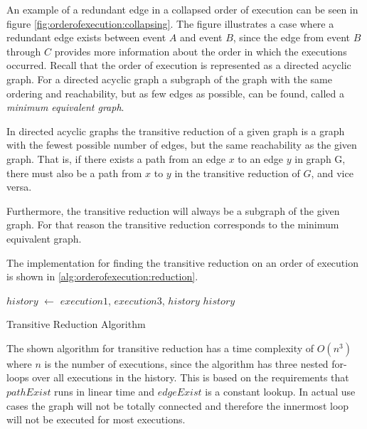 	\newpar An example of a redundant edge in a collapsed order of execution can be seen in figure \autoref{fig:orderofexecution:collapsing}. The figure illustrates a case where a redundant edge exists between event $A$ and event $B$, since the edge from event $B$ through $C$ provides more information about the order in which the executions occurred. 
	Recall that the order of execution is represented as a directed acyclic graph. For a directed acyclic graph a subgraph of the graph with the same ordering and reachability, but as few edges as possible, can be found, called a \textit{minimum equivalent graph}.
	
	\newpar In directed acyclic graphs the transitive reduction of a given graph is a graph with the fewest possible number of edges, but the same reachability as the given graph.	That is, if there exists a path from an edge $x$ to an edge $y$ in graph G, there must also be a path from $x$ to $y$ in the transitive reduction of $G$, and vice versa.
		
	Furthermore, the transitive reduction will always be a subgraph of the given graph. For that reason the transitive reduction corresponds to the minimum equivalent graph.
	
	The implementation for finding the transitive reduction on an order of execution is shown in \autoref{alg:orderofexecution:reduction}.
	
	\begin{algorithm}[H]
		\begin{algorithmic}
										\State $history$ $\leftarrow$  {$execution1$, $execution3$, $history$}
									\EndIf
								\EndIf
							\EndFor
						\EndIf
					\EndFor
				\EndFor
			\State
			\Return $history$
			\EndFunction
		\end{algorithmic}
		\caption{Transitive Reduction Algorithm}
		\label{alg:orderofexecution:reduction}
	\end{algorithm}
	
	\newpar The shown algorithm for transitive reduction has a time complexity of $O(n^3)$ where $n$ is the number of executions, since the algorithm has three nested for-loops over all executions in the history. This is based on the requirements that $pathExist$ runs in linear time and $edgeExist$ is a constant lookup. In actual use cases the graph will not be totally connected and therefore the innermost loop will not be executed for most executions. 

